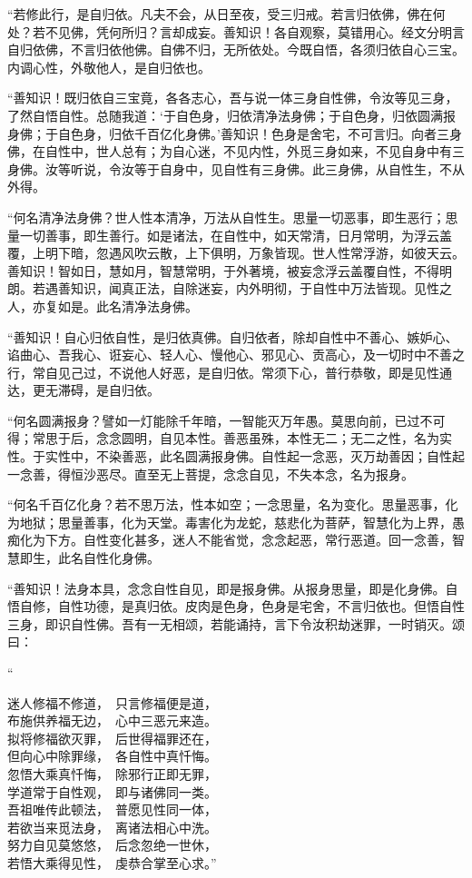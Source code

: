 \documentclass[UTF8, 11pt, oneside]{ctexart}
\newenvironment{jizi}[1]{
    \vspace{-1em}\begin{center}
        #1%
        \begin{varwidth}[t]{\linewidth}
}{
        \end{varwidth}
    \end{center}
}
\begin{document}
“若修此行，是自归依。凡夫不会，从日至夜，受三归戒。若言归依佛，佛在何处？若不见佛，凭何所归？言却成妄。善知识！各自观察，莫错用心。经文分明言自归依佛，不言归依他佛。自佛不归，无所依处。今既自悟，各须归依自心三宝。内调心性，外敬他人，是自归依也。

“善知识！既归依自三宝竟，各各志心，吾与说一体三身自性佛，令汝等见三身，了然自悟自性。总随我道：‘于自色身，归依清净法身佛；于自色身，归依圆满报身佛；于自色身，归依千百亿化身佛。’善知识！色身是舍宅，不可言归。向者三身佛，在自性中，世人总有；为自心迷，不见内性，外觅三身如来，不见自身中有三身佛。汝等听说，令汝等于自身中，见自性有三身佛。此三身佛，从自性生，不从外得。

“何名清净法身佛？世人性本清净，万法从自性生。思量一切恶事，即生恶行；思量一切善事，即生善行。如是诸法，在自性中，如天常清，日月常明，为浮云盖覆，上明下暗，忽遇风吹云散，上下俱明，万象皆现。世人性常浮游，如彼天云。善知识！智如日，慧如月，智慧常明，于外著境，被妄念浮云盖覆自性，不得明朗。若遇善知识，闻真正法，自除迷妄，内外明彻，于自性中万法皆现。见性之人，亦复如是。此名清净法身佛。

“善知识！自心归依自性，是归依真佛。自归依者，除却自性中不善心、嫉妒心、谄曲心、吾我心、诳妄心、轻人心、慢他心、邪见心、贡高心，及一切时中不善之行，常自见己过，不说他人好恶，是自归依。常须下心，普行恭敬，即是见性通达，更无滞碍，是自归依。

“何名圆满报身？譬如一灯能除千年暗，一智能灭万年愚。莫思向前，已过不可得；常思于后，念念圆明，自见本性。善恶虽殊，本性无二；无二之性，名为实性。于实性中，不染善恶，此名圆满报身佛。自性起一念恶，灭万劫善因；自性起一念善，得恒沙恶尽。直至无上菩提，念念自见，不失本念，名为报身。

“何名千百亿化身？若不思万法，性本如空；一念思量，名为变化。思量恶事，化为地狱；思量善事，化为天堂。毒害化为龙蛇，慈悲化为菩萨，智慧化为上界，愚痴化为下方。自性变化甚多，迷人不能省觉，念念起恶，常行恶道。回一念善，智慧即生，此名自性化身佛。

“善知识！法身本具，念念自性自见，即是报身佛。从报身思量，即是化身佛。自悟自修，自性功德，是真归依。皮肉是色身，色身是宅舍，不言归依也。但悟自性三身，即识自性佛。吾有一无相颂，若能诵持，言下令汝积劫迷罪，一时销灭。颂曰：

\begin{jizi}{“}
    迷人修福不修道，　只言修福便是道， \\
    布施供养福无边，　心中三恶元来造。 \\
    拟将修福欲灭罪，　后世得福罪还在， \\
    但向心中除罪缘，　各自性中真忏悔。 \\
    忽悟大乘真忏悔，　除邪行正即无罪， \\
    学道常于自性观，　即与诸佛同一类。 \\
    吾祖唯传此顿法，　普愿见性同一体， \\
    若欲当来觅法身，　离诸法相心中洗。 \\
    努力自见莫悠悠，　后念忽绝一世休， \\
    若悟大乘得见性，　虔恭合掌至心求。”
\end{jizi}
\end{document}
